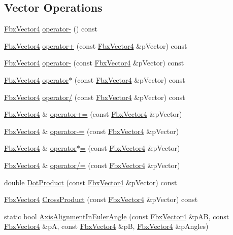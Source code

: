 \subsection*{Vector Operations}
\begin{DoxyCompactItemize}
\item 
\hyperlink{class_fbx_vector4}{Fbx\+Vector4} \hyperlink{class_fbx_vector4_aee704c3c0622de74004355ff999c934b}{operator-\/} () const
\item 
\hyperlink{class_fbx_vector4}{Fbx\+Vector4} \hyperlink{class_fbx_vector4_aa85736514639224c7e1057facc73a040}{operator+} (const \hyperlink{class_fbx_vector4}{Fbx\+Vector4} \&p\+Vector) const
\item 
\hyperlink{class_fbx_vector4}{Fbx\+Vector4} \hyperlink{class_fbx_vector4_a5c49b63dc74031c9c977fb94c9bd5fd8}{operator-\/} (const \hyperlink{class_fbx_vector4}{Fbx\+Vector4} \&p\+Vector) const
\item 
\hyperlink{class_fbx_vector4}{Fbx\+Vector4} \hyperlink{class_fbx_vector4_ab125b0b39c89ef465e68502b66d20a2a}{operator$\ast$} (const \hyperlink{class_fbx_vector4}{Fbx\+Vector4} \&p\+Vector) const
\item 
\hyperlink{class_fbx_vector4}{Fbx\+Vector4} \hyperlink{class_fbx_vector4_ad1477f8303d7649b10864ba8c721309c}{operator/} (const \hyperlink{class_fbx_vector4}{Fbx\+Vector4} \&p\+Vector) const
\item 
\hyperlink{class_fbx_vector4}{Fbx\+Vector4} \& \hyperlink{class_fbx_vector4_a0db8c14b539c1a47b3a7a996569e1c89}{operator+=} (const \hyperlink{class_fbx_vector4}{Fbx\+Vector4} \&p\+Vector)
\item 
\hyperlink{class_fbx_vector4}{Fbx\+Vector4} \& \hyperlink{class_fbx_vector4_adbfdb7ee65fb83a6a489200e2a45f613}{operator-\/=} (const \hyperlink{class_fbx_vector4}{Fbx\+Vector4} \&p\+Vector)
\item 
\hyperlink{class_fbx_vector4}{Fbx\+Vector4} \& \hyperlink{class_fbx_vector4_a77aeb266383501325fb91538ca17ff4c}{operator$\ast$=} (const \hyperlink{class_fbx_vector4}{Fbx\+Vector4} \&p\+Vector)
\item 
\hyperlink{class_fbx_vector4}{Fbx\+Vector4} \& \hyperlink{class_fbx_vector4_a949819573b3bcb8b8fa1185c81aa6671}{operator/=} (const \hyperlink{class_fbx_vector4}{Fbx\+Vector4} \&p\+Vector)
\item 
double \hyperlink{class_fbx_vector4_adef4af04dc2011fb6553fad79d445ed0}{Dot\+Product} (const \hyperlink{class_fbx_vector4}{Fbx\+Vector4} \&p\+Vector) const
\item 
\hyperlink{class_fbx_vector4}{Fbx\+Vector4} \hyperlink{class_fbx_vector4_a811b7b26ede7d4306497c9ca78f4b068}{Cross\+Product} (const \hyperlink{class_fbx_vector4}{Fbx\+Vector4} \&p\+Vector) const
\item 
static bool \hyperlink{class_fbx_vector4_a4c3afde83799eb1ebd515d16d53ffd63}{Axis\+Alignment\+In\+Euler\+Angle} (const \hyperlink{class_fbx_vector4}{Fbx\+Vector4} \&p\+AB, const \hyperlink{class_fbx_vector4}{Fbx\+Vector4} \&pA, const \hyperlink{class_fbx_vector4}{Fbx\+Vector4} \&pB, \hyperlink{class_fbx_vector4}{Fbx\+Vector4} \&p\+Angles)
\end{DoxyCompactItemize}
